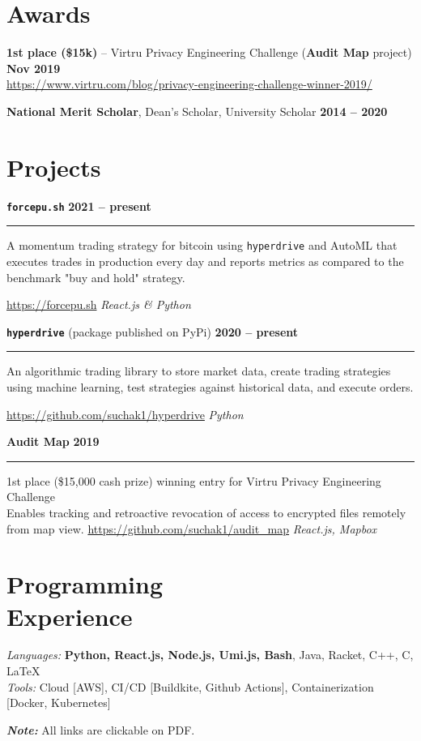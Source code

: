 \documentclass[margin]{resume}
\begin{document}



    \section{\mysidestyle Awards}
    \textcolor{blu}{\textbf{1st place (\$15k)}} -- Virtru Privacy Engineering Challenge (\textbf {Audit Map} project) \hfill \textbf{Nov 2019} \\ \url{https://www.virtru.com/blog/privacy-engineering-challenge-winner-2019/}

\textbf{National Merit Scholar}, Dean’s Scholar, University Scholar \hfill \textbf{2014 -- 2020} %

    \section{\mysidestyle Projects}

\texttt{\textbf{force}\textcolor{blu}{\textbf{pu.sh}}} \hfill \textbf{2021 -- present}
\hrule
A momentum trading strategy for bitcoin using \texttt{hyperdrive} and AutoML that executes trades in production every day and reports metrics as compared to the benchmark "buy and hold" strategy.

\url{https://forcepu.sh} \hfill \textit{React.js \& Python}


\texttt{\textbf{hyperdrive}} (package published on PyPi) \hfill \textbf{2020 -- present}
\hrule
An algorithmic trading library to store market data, create trading strategies using machine learning, test strategies against historical data, and execute orders.

\url{https://github.com/suchak1/hyperdrive} \hfill \textit{Python}

\textcolor{blu}{\textbf{Audit Map}} \hfill \textbf{2019}
\hrule
1st place (\$15,000 cash prize) winning entry for Virtru Privacy Engineering Challenge \\ 
Enables tracking and retroactive revocation of access to encrypted files remotely from map view.
\url{https://github.com/suchak1/audit_map} \hfill \textit{React.js, Mapbox}
        \section{\mysidestyle Programming\\Experience}

    \emph{Languages:} \textbf{Python, React.js, Node.js, Umi.js, Bash}, Java, Racket, C++, C, \LaTeX \\
    \emph{Tools:} Cloud [AWS], CI/CD [Buildkite, Github Actions], Containerization [Docker, Kubernetes]
    
\textbf {\textit {Note:}} All links are clickable on PDF.
    
\end{document}
